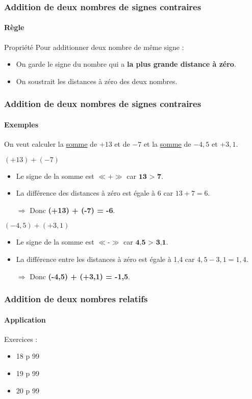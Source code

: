 \documentclass{beamer}
\begin{document}
\begin{frame}
	\frametitle{Addition de deux nombres de signes contraires}  
	\framesubtitle{Règle}	
	
	\begin{block}{Propriété}
		Pour additionner deux nombre de même signe :
		\begin{itemize}
			\item On garde le signe du nombre qui a \textbf{la plus grande distance à zéro}. 
			\item On soustrait les distances à zéro des deux nombres. 
		\end{itemize}
	\end{block}	
	
\end{frame}

\begin{frame}
	\frametitle{Addition de deux nombres de signes contraires}  
	\framesubtitle{Exemples}	
	
	On veut calculer la \underline{somme} de $ +13 $ et de $ -7 $ et la \underline{somme} de $ -4,5 $ et $ +3,1 $.\pause
	
	\begin{exampleblock}{$ (+13) + (-7) $}
		\begin{itemize}\pause
			\item Le signe de la somme est $ \ll \textbf{+} \gg $ car $\textbf{13 > 7}$.\pause
			\item La différence des distances à zéro est égale à 6 
			car $ 13 + 7 = 6 $.\pause
			\item[$\Rightarrow$] Donc \textbf{(+13) + (-7) = -6}.\pause
		\end{itemize}
	\end{exampleblock}
	
	\begin{exampleblock}{$ (-4,5) + (+3,1) $}
		\begin{itemize}
			\item Le signe de la somme est $ \ll \textbf{-} \gg $ car $\textbf{4,5 > 3,1}$.
			\item La différence entre les distances à zéro est égale à 1,4 
			car $ 4,5 - 3,1 = 1,4 $.
			\item[$\Rightarrow$] Donc \textbf{(-4,5) + (+3,1) = -1,5}.
		\end{itemize}
	\end{exampleblock}
\end{frame}


\begin{frame}
	\frametitle{Addition de deux nombres relatifs}  
	\framesubtitle{Application}	
	
	Exercices :
	\begin{itemize}
		\item 18 p 99
		\item 19 p 99
		\item 20 p 99
	\end{itemize}
\end{frame}
\end{document}
